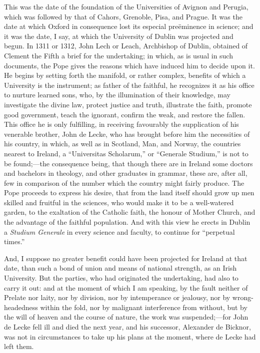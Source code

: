 This was the date of the
foundation of the Universities of Avignon and Perugia, which was
followed by that of Cahors, Grenoble, Pisa, and Prague. It was the
date at which Oxford in consequence lost its especial preëminence in
science; and it was the date, I say, at which the University of Dublin
was projected and begun. In 1311 or 1312, John Lech or Leach,
Archbishop of Dublin, obtained of Clement the Fifth a brief for the
undertaking; in which, as is usual in such documents, the Pope gives
the reasons which have induced him to decide upon it. He begins by
setting forth the manifold, or rather complex, benefits of which a
University is the instrument; as father of the faithful, he recognizes
it as his office to nurture learned sons, who, by the illumination of
their knowledge, may investigate the divine law, protect justice and
truth, illustrate the faith, promote good government, teach the
ignorant, confirm the weak, and restore the fallen. This office he is
only fulfilling, in receiving favourably the supplication of his
venerable brother, John de Lecke, who has brought before him the
necessities of his country, in which, as well as in Scotland, Man, and
Norway, the countries nearest to Ireland, a ``Universitas Scholarum,''
or ``Generale Studium,'' is not to be found;—the consequence
being, that though there are in Ireland some doctors and bachelors in
theology, and other graduates in grammar, these are, after all, few in
comparison of the number which the country might fairly produce. The
Pope proceeds to express his desire, that from the land itself should
grow up men skilled and fruitful in the sciences, who would make it to
be a well-watered garden, to the exaltation of the Catholic faith, the
honour of Mother Church, and the advantage of the faithful population.
And with this view he erects in Dublin a \emph{Studium Generale} in
every science and faculty, to continue for ``perpetual times.''

And, I suppose no greater
benefit could have been projected for Ireland at that date, than such
a bond of union and means of national strength, as an Irish
University. But the parties, who had originated the undertaking, had
also to carry it out: and at the moment of which I am speaking, by the
fault neither of Prelate nor laity, nor by division, nor by
intemperance or jealousy, nor by wrong-headedness within the fold, nor
by malignant interference from without, but by the will of heaven and
the course of nature, the work was suspended;—for John de Lecke fell
ill and died the next year, and his successor, Alexander de Bicknor,
was not in circumstances to take up his plans at the moment, where de
Lecke had left them.

